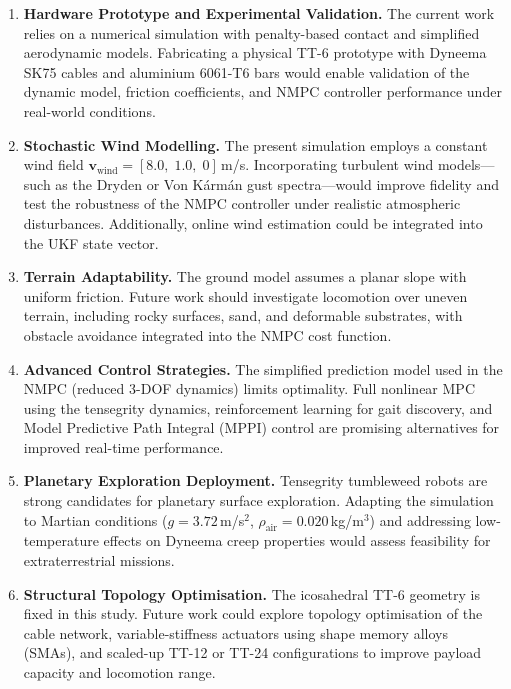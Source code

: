 \begin{enumerate}

\item \textbf{Hardware Prototype and Experimental Validation.}
The current work relies on a numerical simulation with penalty-based contact
and simplified aerodynamic models. Fabricating a physical TT-6 prototype
with Dyneema SK75 cables and aluminium 6061-T6 bars would enable
validation of the dynamic model, friction coefficients, and NMPC
controller performance under real-world conditions.

\item \textbf{Stochastic Wind Modelling.}
The present simulation employs a constant wind field
$\mathbf{v}_{\mathrm{wind}} = [8.0,\;1.0,\;0]$\,m/s. Incorporating
turbulent wind models---such as the Dryden or Von K\'{a}rm\'{a}n gust
spectra---would improve fidelity and test the robustness of the NMPC
controller under realistic atmospheric disturbances. Additionally,
online wind estimation could be integrated into the UKF state vector.

\item \textbf{Terrain Adaptability.}
The ground model assumes a planar slope with uniform friction. Future
work should investigate locomotion over uneven terrain, including rocky
surfaces, sand, and deformable substrates, with obstacle avoidance
integrated into the NMPC cost function.

\item \textbf{Advanced Control Strategies.}
The simplified prediction model used in the NMPC (reduced 3-DOF
dynamics) limits optimality. Full nonlinear MPC using the tensegrity
dynamics, reinforcement learning for gait discovery, and Model
Predictive Path Integral (MPPI) control are promising alternatives for
improved real-time performance.

\item \textbf{Planetary Exploration Deployment.}
Tensegrity tumbleweed robots are strong candidates for planetary
surface exploration. Adapting the simulation to Martian conditions
($g = 3.72$\,m/s$^2$, $\rho_{\mathrm{air}} = 0.020$\,kg/m$^3$)
and addressing low-temperature effects on Dyneema creep properties
would assess feasibility for extraterrestrial missions.

\item \textbf{Structural Topology Optimisation.}
The icosahedral TT-6 geometry is fixed in this study. Future work could
explore topology optimisation of the cable network, variable-stiffness
actuators using shape memory alloys (SMAs), and scaled-up TT-12 or
TT-24 configurations to improve payload capacity and locomotion range.


\end{enumerate}
